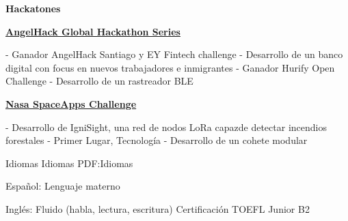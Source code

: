 \documentclass[letterpaper,yyyy,draft]{simpleresumecv}
\begin{document}
\begin{Body}
{    \Gap
    \Entry
    \textbf{Hackatones}
    {
        {
            \BulletItem
            \href{https://angelhack.com}{\textbf{AngelHack Global Hackathon Series}}
            \hfill
            \begin{Detail}
            \Gap
             - Ganador AngelHack Santiago y EY Fintech challenge - \newline Desarrollo de un banco digital con focus en nuevos trabajadores e inmigrantes
            \Gap
             - Ganador Hurify Open Challenge - Desarrollo de un rastreador BLE
            \end{Detail}
        }
        {
            \Gap
            \BulletItem
            \href{https://spaceappschallenge.org}{\textbf{Nasa SpaceApps Challenge}}
            \hfill
            \begin{Detail}
            \Gap
             - Desarrollo de IgniSight, una red de nodos LoRa capaz\newline de detectar incendios forestales
            \Gap
             - Primer Lugar, Tecnología - Desarrollo de un cohete modular
            \end{Detail}
        }
    }
}


\Section
{Idiomas}
{Idiomas}
{PDF:Idiomas}
{
    {
        \BulletItem
        Español: Lenguaje materno
    }

    \Gap

    {
        \BulletItem
        Inglés: Fluido (habla, lectura, escritura)
        \SubBulletItem
        Certificación TOEFL Junior B2
    }
}
\end{Body}
\end{document}
